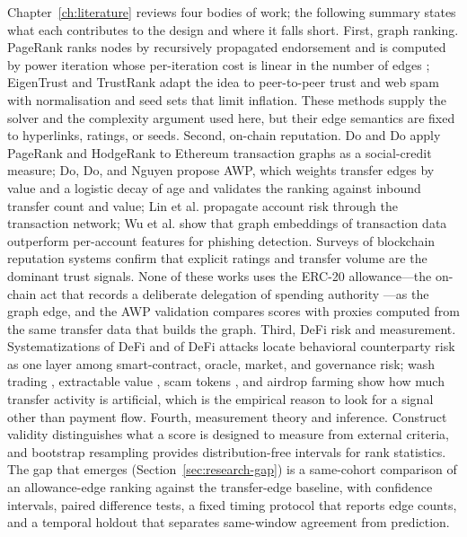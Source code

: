 Chapter~\ref{ch:literature} reviews four bodies of work; the following summary states what each contributes to the design and where it falls short. First, graph ranking. PageRank  ranks nodes by recursively propagated endorsement and is computed by power iteration whose per-iteration cost is linear in the number of edges ; EigenTrust  and TrustRank  adapt the idea to peer-to-peer trust and web spam with normalisation and seed sets that limit inflation. These methods supply the solver and the complexity argument used here, but their edge semantics are fixed to hyperlinks, ratings, or seeds. Second, on-chain reputation. Do and Do apply PageRank and HodgeRank to Ethereum transaction graphs as a social-credit measure; Do, Do, and Nguyen propose AWP, which weights transfer edges by value and a logistic decay of age and validates the ranking against inbound transfer count and value; Lin et al. propagate account risk through the transaction network; Wu et al. show that graph embeddings of transaction data outperform per-account features for phishing detection. Surveys of blockchain reputation systems  confirm that explicit ratings and transfer volume are the dominant trust signals. None of these works uses the ERC-20 allowance---the on-chain act that records a deliberate delegation of spending authority ---as the graph edge, and the AWP validation compares scores with proxies computed from the same transfer data that builds the graph. Third, DeFi risk and measurement. Systematizations of DeFi  and of DeFi attacks  locate behavioral counterparty risk as one layer among smart-contract, oracle, market, and governance risk; wash trading , extractable value , scam tokens , and airdrop farming  show how much transfer activity is artificial, which is the empirical reason to look for a signal other than payment flow. Fourth, measurement theory and inference. Construct validity  distinguishes what a score is designed to measure from external criteria, and bootstrap resampling  provides distribution-free intervals for rank statistics. The gap that emerges (Section~\ref{sec:research-gap}) is a same-cohort comparison of an allowance-edge ranking against the transfer-edge baseline, with confidence intervals, paired difference tests, a fixed timing protocol that reports edge counts, and a temporal holdout that separates same-window agreement from prediction.


